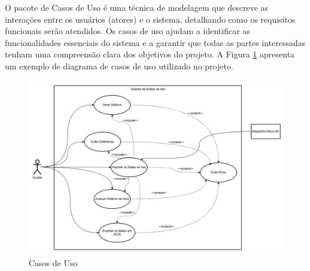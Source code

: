\begin{samepage}

O pacote de Casos de Uso é uma técnica de modelagem que descreve as interações entre os usuários (atores) e o sistema, detalhando como os requisitos funcionais serão atendidos. Os casos de uso ajudam a identificar as funcionalidades essenciais do sistema e a garantir que todas as partes interessadas tenham uma compreensão clara dos objetivos do projeto. A Figura \ref{fig_casos_de_uso} apresenta um exemplo de diagrama de casos de uso utilizado no projeto.
\begin{figure}[H]
	\centering
	\includegraphics[width=15cm]{figuras/caso_de_uso.png}
	\caption{Casos de Uso}
	\label{fig_casos_de_uso}
\end{figure}
\end{samepage}


